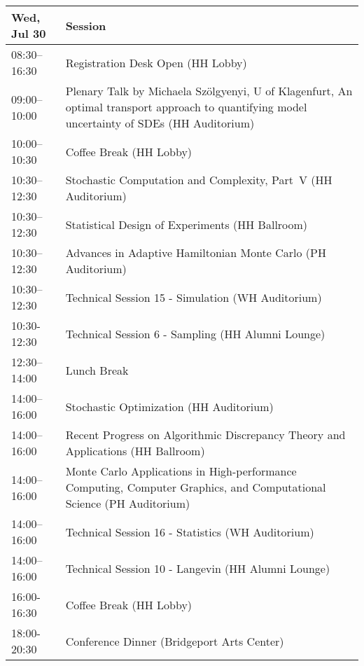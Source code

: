 \begin{table}
{\footnotesize
\begin{tabularx}{\textwidth}{>{\hsize=0.32\hsize}X|>{\hsize=1.7\hsize}X}
\hline
\textbf{Wed, Jul 30} & \textbf{Session} \\
\hline
\cellcolor{\EmptyColor}08:30–16:30 & \cellcolor{\EmptyColor}Registration Desk Open (HH Lobby) \\
\cellcolor{\PlenaryColor}09:00–10:00 & \cellcolor{\PlenaryColor}Plenary Talk by Michaela Szölgyenyi, U of Klagenfurt, An optimal transport approach to quantifying model uncertainty of SDEs (HH Auditorium) \\
\cellcolor{\EmptyColor}10:00–10:30 & \cellcolor{\EmptyColor}Coffee Break (HH Lobby) \\
\cellcolor{\SessionTitleColor}10:30–12:30 & \cellcolor{\SessionTitleColor}Stochastic Computation and Complexity, Part~V (HH Auditorium) \\
\cellcolor{\SessionTitleColor}10:30–12:30 & \cellcolor{\SessionTitleColor}Statistical Design of Experiments (HH Ballroom) \\
\cellcolor{\SessionTitleColor}10:30–12:30 & \cellcolor{\SessionTitleColor}Advances in Adaptive Hamiltonian Monte Carlo (PH Auditorium) \\
\cellcolor{\SessionLightColor}10:30–12:30 & \cellcolor{\SessionLightColor}Technical Session 15 - Simulation (WH Auditorium) \\
\cellcolor{\SessionLightColor}10:30-12:30 & \cellcolor{\SessionLightColor}Technical Session 6 - Sampling (HH Alumni Lounge) \\
\cellcolor{\EmptyColor}12:30–14:00 & \cellcolor{\EmptyColor}Lunch Break \\
\cellcolor{\SessionTitleColor}14:00–16:00 & \cellcolor{\SessionTitleColor}Stochastic Optimization (HH Auditorium) \\
\cellcolor{\SessionTitleColor}14:00–16:00 & \cellcolor{\SessionTitleColor}Recent Progress on Algorithmic Discrepancy Theory and Applications (HH Ballroom) \\
\cellcolor{\SessionTitleColor}14:00–16:00 & \cellcolor{\SessionTitleColor}Monte Carlo Applications in High-performance Computing, Computer Graphics, and Computational Science (PH Auditorium) \\
\cellcolor{\SessionLightColor}14:00–16:00 & \cellcolor{\SessionLightColor}Technical Session 16 - Statistics (WH Auditorium) \\
\cellcolor{\SessionLightColor}14:00–16:00 & \cellcolor{\SessionLightColor}Technical Session 10 - Langevin (HH Alumni Lounge) \\
\cellcolor{\EmptyColor}16:00-16:30 & \cellcolor{\EmptyColor}Coffee Break (HH Lobby) \\
\cellcolor{\EmptyColor}18:00-20:30 & \cellcolor{\EmptyColor}Conference Dinner (Bridgeport Arts Center) \\
\hline
\end{tabularx}
}
\end{table}

